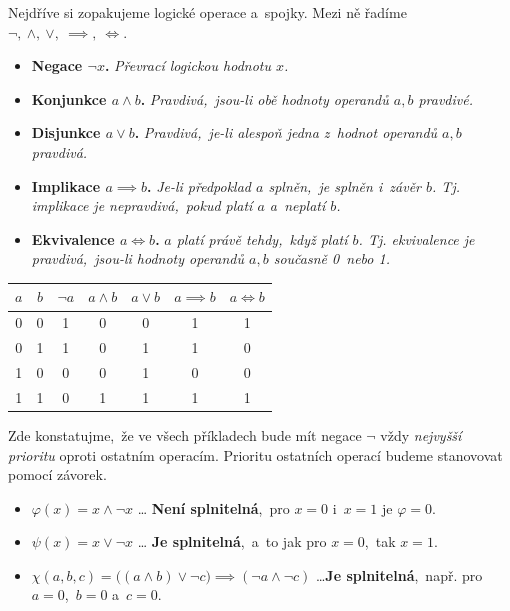 Nejdříve si zopakujeme logické operace a~spojky. Mezi ně řadíme $\neg,~\land,~\lor,~\implies,~\iff$.
\begin{itemize}
    \item \textbf{Negace $\neg x$.} \emph{Převrací logickou hodnotu $x$.}
    \item \textbf{Konjunkce $a\land b$.} \emph{Pravdivá,~jsou-li obě hodnoty operandů $a,b$ pravdivé.}
    \item \textbf{Disjunkce $a\lor b$.} \emph{Pravdivá,~je-li alespoň jedna z~hodnot operandů $a,b$ pravdivá.}
    \item \textbf{Implikace $a\implies b$.} \emph{Je-li předpoklad $a$ splněn,~je splněn i~závěr $b$. Tj. implikace je nepravdivá,~pokud platí $a$ a~neplatí $b$.}
    \item \textbf{Ekvivalence $a\iff b$.} \emph{$a$ platí právě tehdy,~když platí $b$. Tj. ekvivalence je pravdivá,~jsou-li hodnoty operandů $a,b$ současně 0~nebo 1.}
\end{itemize}
\begin{table}[ht]\label{table:logicke_operace}
    \centering
    \begin{tabular}{|c|c|c|c|c|c|c|}
    \hline
    $a$ & $b$ & $\neg a$ & $a\land b$ & $a\lor b$ & $a\implies b$ & $a\iff b$ \\ \hline
    0   & 0   & 1        & 0          & 0         & 1             & 1         \\ \hline
    0   & 1   & 1        & 0          & 1         & 1             & 0         \\ \hline
    1   & 0   & 0        & 0          & 1         & 0             & 0         \\ \hline
    1   & 1   & 0        & 1          & 1         & 1             & 1         \\ \hline
    \end{tabular}
\end{table}
Zde konstatujme,~že ve všech příkladech bude mít negace $\neg$ vždy \emph{nejvyšší prioritu} oproti ostatním operacím. Prioritu ostatních operací budeme stanovovat pomocí závorek. 
\begin{example}\label{ex:sat_formule}
    \begin{itemize}
        \item $\varphi(x)=x\land\neg x$ \dots \textbf{ Není splnitelná},~pro $x=0$ i~$x=1$ je $\varphi=0$.
        \item $\psi(x)=x\lor\neg x$ \dots \textbf{ Je splnitelná},~a~to jak pro $x=0$,~tak $x=1$.
        \item $\chi(a,b,c)=\big((a\land b)\lor \neg c\big)\implies (\neg a\land\neg c)$ \dots \textbf{Je splnitelná},~např. pro $a=0$,~$b=0$ a~$c=0$.
    \end{itemize}
\end{example}
